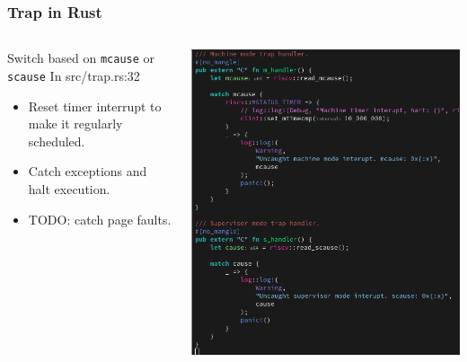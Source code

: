 \documentclass{beamer}
\begin{document}
\begin{frame}[fragile]
  \frametitle{Trap in Rust}
  \begin{columns}
    \begin{column}{0.5\textwidth}
      Switch based on \verb_mcause_ or \verb_scause_
      In src/trap.rs:32
      \begin{itemize}
      \item Reset timer interrupt to make it regularly scheduled.\\
      \item Catch exceptions and halt execution.\\
      \item TODO: catch page faults.
      \end{itemize}
    \end{column}
    \begin{column}{0.5\textwidth}
      \includegraphics[width=\textwidth]{traprs.png}
    \end{column}
  \end{columns}
\end{frame}
\end{document}
